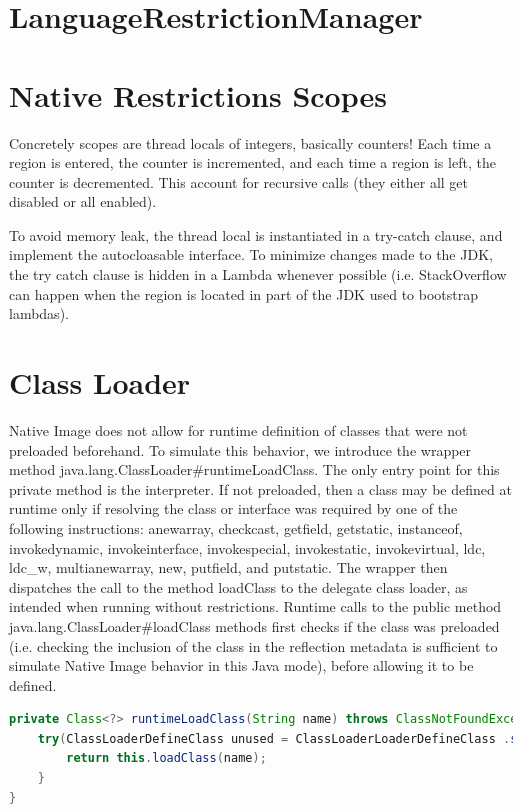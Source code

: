 \section{LanguageRestrictionManager}


\section{Native Restrictions Scopes}
Concretely scopes are thread locals of integers, basically counters!
Each time a region is entered, the counter is incremented, and each time a region is left, the counter is decremented. This account for recursive calls (they either all get disabled or all enabled).

To avoid memory leak, the thread local is instantiated in a try-catch clause, and implement the autocloasable interface.
To minimize changes made to the JDK, the try catch clause is hidden in a Lambda whenever possible (i.e. StackOverflow can happen when the region is located in part of the JDK used to bootstrap lambdas).


\section{Class Loader}
Native Image does not allow for runtime definition of classes that were not preloaded beforehand.
To simulate this behavior, we introduce the wrapper method java.lang.ClassLoader#runtimeLoadClass. The only entry point for this private method is the interpreter. If not preloaded, then a class may be defined at runtime only if resolving the class or interface was required by one of the following instructions:
anewarray, checkcast, getfield, getstatic, instanceof, invokedynamic, invokeinterface, invokespecial,
invokestatic, invokevirtual, ldc, ldc\_w, multianewarray, new, putfield, and putstatic.
The wrapper then dispatches the call to the method loadClass to the delegate class loader, as intended when running without restrictions.
Runtime calls to the public method java.lang.ClassLoader#loadClass methods first checks if the class was preloaded (i.e. checking the inclusion of the class in the reflection metadata is sufficient to simulate Native Image behavior in this Java mode), before allowing it to be defined.

\begin{lstlisting}[language=Java]
private Class<?> runtimeLoadClass(String name) throws ClassNotFoundException {
    try(ClassLoaderDefineClass unused = ClassLoaderLoaderDefineClass .setIsRuntimeDefineClassAllowed()) {
        return this.loadClass(name);
    }
}
\end{lstlisting}

